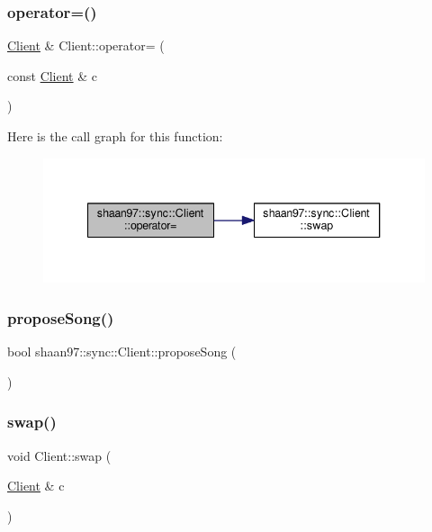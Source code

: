 \subsubsection{\texorpdfstring{operator=()}{operator=()}}
{\footnotesize\ttfamily \hyperlink{classshaan97_1_1sync_1_1_client}{Client} \& Client\+::operator= (\begin{DoxyParamCaption}\item[{const \hyperlink{classshaan97_1_1sync_1_1_client}{Client} \&}]{c }\end{DoxyParamCaption})}

Here is the call graph for this function\+:\nopagebreak
\begin{figure}[H]
\begin{center}
\leavevmode
\includegraphics[width=340pt]{classshaan97_1_1sync_1_1_client_a807d5ec3cc4cc0bcc3d5dec72fc3af06_cgraph}
\end{center}
\end{figure}
\mbox{\label{classshaan97_1_1sync_1_1_client_a603ec6160f76f97fcfb41d099fdea6ab}} 
\subsubsection{\texorpdfstring{propose\+Song()}{proposeSong()}}
{\footnotesize\ttfamily bool shaan97\+::sync\+::\+Client\+::propose\+Song (\begin{DoxyParamCaption}{ }\end{DoxyParamCaption})}

\mbox{\label{classshaan97_1_1sync_1_1_client_a6429d2c4549c9fd3074f3181923c5906}} 
\subsubsection{\texorpdfstring{swap()}{swap()}}
{\footnotesize\ttfamily void Client\+::swap (\begin{DoxyParamCaption}\item[{\hyperlink{classshaan97_1_1sync_1_1_client}{Client} \&}]{c }\end{DoxyParamCaption})}

